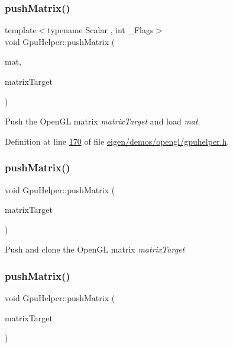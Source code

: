 \subsubsection{\texorpdfstring{push\+Matrix()}{pushMatrix()}\hspace{0.1cm}{\footnotesize\ttfamily [2/4]}}
{\footnotesize\ttfamily template$<$typename Scalar , int \+\_\+\+Flags$>$ \\
void Gpu\+Helper\+::push\+Matrix (\begin{DoxyParamCaption}\item[{const \hyperlink{group___core___module_class_eigen_1_1_matrix}{Matrix}$<$ Scalar, 4, 4, \+\_\+\+Flags, 4, 4 $>$ \&}]{mat,  }\item[{G\+Lenum}]{matrix\+Target }\end{DoxyParamCaption})\hspace{0.3cm}{\ttfamily [inline]}}

Push the Open\+GL matrix {\itshape matrix\+Target} and load {\itshape mat}. 

Definition at line \hyperlink{eigen_2demos_2opengl_2gpuhelper_8h_source_l00170}{170} of file \hyperlink{eigen_2demos_2opengl_2gpuhelper_8h_source}{eigen/demos/opengl/gpuhelper.\+h}.

\mbox{\label{class_gpu_helper_a515a9248689ca95d90a1919b2e6973ec}} 
\subsubsection{\texorpdfstring{push\+Matrix()}{pushMatrix()}\hspace{0.1cm}{\footnotesize\ttfamily [3/4]}}
{\footnotesize\ttfamily void Gpu\+Helper\+::push\+Matrix (\begin{DoxyParamCaption}\item[{G\+Lenum}]{matrix\+Target }\end{DoxyParamCaption})\hspace{0.3cm}{\ttfamily [inline]}}

Push and clone the Open\+GL matrix {\itshape matrix\+Target} \mbox{\label{class_gpu_helper_a515a9248689ca95d90a1919b2e6973ec}} 
\subsubsection{\texorpdfstring{push\+Matrix()}{pushMatrix()}\hspace{0.1cm}{\footnotesize\ttfamily [4/4]}}
{\footnotesize\ttfamily void Gpu\+Helper\+::push\+Matrix (\begin{DoxyParamCaption}\item[{G\+Lenum}]{matrix\+Target }\end{DoxyParamCaption})\hspace{0.3cm}{\ttfamily [inline]}}


